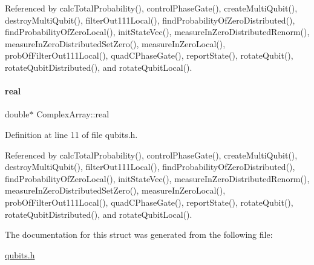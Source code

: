 Referenced by calc\+Total\+Probability(), control\+Phase\+Gate(), create\+Multi\+Qubit(), destroy\+Multi\+Qubit(), filter\+Out111\+Local(), find\+Probability\+Of\+Zero\+Distributed(), find\+Probability\+Of\+Zero\+Local(), init\+State\+Vec(), measure\+In\+Zero\+Distributed\+Renorm(), measure\+In\+Zero\+Distributed\+Set\+Zero(), measure\+In\+Zero\+Local(), prob\+Of\+Filter\+Out111\+Local(), quad\+C\+Phase\+Gate(), report\+State(), rotate\+Qubit(), rotate\+Qubit\+Distributed(), and rotate\+Qubit\+Local().

\mbox{\label{structComplexArray_a1cf9fd31d6dce5ef618d2bcf3e4f8b69}} 
\paragraph{\texorpdfstring{real}{real}}
{\footnotesize\ttfamily double$\ast$ Complex\+Array\+::real}



Definition at line 11 of file qubits.\+h.



Referenced by calc\+Total\+Probability(), control\+Phase\+Gate(), create\+Multi\+Qubit(), destroy\+Multi\+Qubit(), filter\+Out111\+Local(), find\+Probability\+Of\+Zero\+Distributed(), find\+Probability\+Of\+Zero\+Local(), init\+State\+Vec(), measure\+In\+Zero\+Distributed\+Renorm(), measure\+In\+Zero\+Distributed\+Set\+Zero(), measure\+In\+Zero\+Local(), prob\+Of\+Filter\+Out111\+Local(), quad\+C\+Phase\+Gate(), report\+State(), rotate\+Qubit(), rotate\+Qubit\+Distributed(), and rotate\+Qubit\+Local().



The documentation for this struct was generated from the following file\+:\begin{DoxyCompactItemize}
\item 
\hyperlink{qubits_8h}{qubits.\+h}\end{DoxyCompactItemize}
